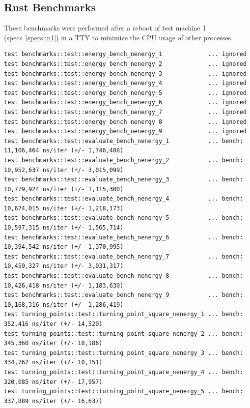 \documentclass[11pt,DIV=10,final]{scrreprt} %
\renewcommand{\lstlistingname}{Code Snippet} %
\begin{document}
\begin{appendix}
{\subsection{Rust Benchmarks}
\renewcommand{\lstlistingname}{Output} %
These benchmarks were performed after a reboot of test machine 1 (specs~\ref{specs:m1}) in a TTY to minimize the CPU usage of other processes.
\begin{lstlisting}[caption={
Test run on machine 1, the energy tests were ignored because they take about 2 hours to run.
}]
test benchmarks::test::energy_bench_nenergy_1             ... ignored
test benchmarks::test::energy_bench_nenergy_2             ... ignored
test benchmarks::test::energy_bench_nenergy_3             ... ignored
test benchmarks::test::energy_bench_nenergy_4             ... ignored
test benchmarks::test::energy_bench_nenergy_5             ... ignored
test benchmarks::test::energy_bench_nenergy_6             ... ignored
test benchmarks::test::energy_bench_nenergy_7             ... ignored
test benchmarks::test::energy_bench_nenergy_8             ... ignored
test benchmarks::test::energy_bench_nenergy_9             ... ignored
test benchmarks::test::evaluate_bench_nenergy_1           ... bench:  11,106,464 ns/iter (+/- 1,746,488)
test benchmarks::test::evaluate_bench_nenergy_2           ... bench:  10,952,637 ns/iter (+/- 3,015,099)
test benchmarks::test::evaluate_bench_nenergy_3           ... bench:  10,779,924 ns/iter (+/- 1,115,300)
test benchmarks::test::evaluate_bench_nenergy_4           ... bench:  10,674,015 ns/iter (+/- 1,218,173)
test benchmarks::test::evaluate_bench_nenergy_5           ... bench:  10,597,315 ns/iter (+/- 1,565,714)
test benchmarks::test::evaluate_bench_nenergy_6           ... bench:  10,394,542 ns/iter (+/- 1,370,995)
test benchmarks::test::evaluate_bench_nenergy_7           ... bench:  10,459,327 ns/iter (+/- 3,031,317)
test benchmarks::test::evaluate_bench_nenergy_8           ... bench:  10,426,418 ns/iter (+/- 1,183,630)
test benchmarks::test::evaluate_bench_nenergy_9           ... bench:  10,168,316 ns/iter (+/- 1,286,419)
test turning_points::test::turning_point_square_nenergy_1 ... bench:     352,416 ns/iter (+/- 14,520)
test turning_points::test::turning_point_square_nenergy_2 ... bench:     345,360 ns/iter (+/- 18,186)
test turning_points::test::turning_point_square_nenergy_3 ... bench:     334,762 ns/iter (+/- 10,151)
test turning_points::test::turning_point_square_nenergy_4 ... bench:     320,085 ns/iter (+/- 17,957)
test turning_points::test::turning_point_square_nenergy_5 ... bench:     337,889 ns/iter (+/- 16,637)

\end{lstlisting}}
\end{appendix}
\end{document}
